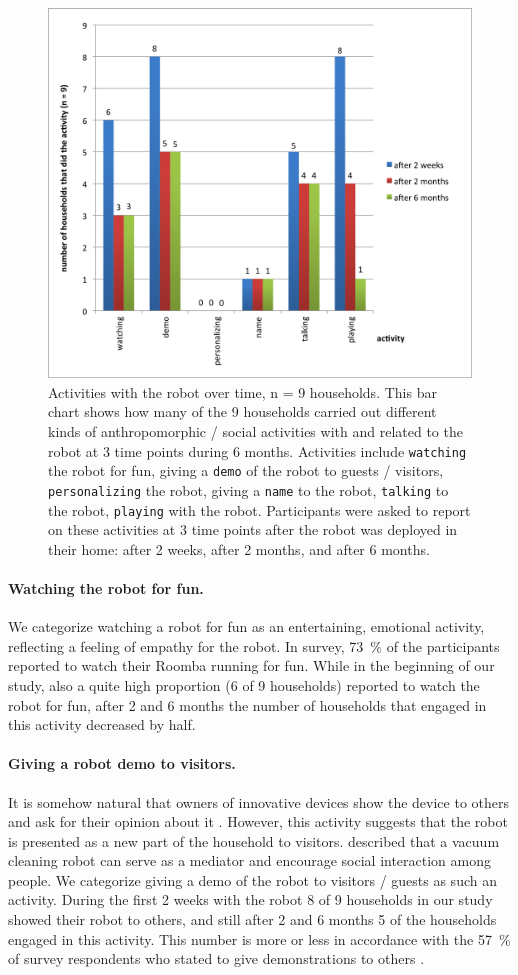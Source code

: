 \documentclass{frontiersSCNS} %
\begin{document}
\begin{figure}[hb]
    \centering
    \includegraphics[width=0.5\columnwidth]{roomba-activities.png}
    \caption{Activities with the robot over time, n = 9 households. This bar
        chart shows how many of the 9 households carried out different kinds of
        anthropomorphic / social activities with and related to the robot at 3
        time points during 6 months. Activities include \texttt{watching} the
        robot for fun, giving a \texttt{demo} of the robot to guests / visitors,
        \texttt{personalizing} the robot, giving a \texttt{name} to the robot,
        \texttt{talking} to the robot, \texttt{playing} with the robot.
        Participants were asked to report on these activities at 3 time points
        after the robot was deployed in their home: after 2 weeks, after 2 months,
        and after 6 months.} 

\label{fig:roomba-activities}
\end{figure}

\paragraph*{Watching the robot for fun.} We categorize watching a robot for fun
as an entertaining, emotional activity, reflecting a feeling of empathy for the
robot. In \cite{sung_housewives_2008} survey, 73~\% of the participants reported
to watch their Roomba running for fun. While in the beginning of our study, also
a quite high proportion (6 of 9 households) reported to watch the robot for fun,
after 2 and 6 months the number of households that engaged in this activity
decreased by half. 

\paragraph*{Giving a robot demo to visitors.} It is somehow natural that owners
of innovative devices show the device to others and ask for their opinion about
it \citep{rogers_diffusion_1995}. However, this activity suggests that the robot
is presented as a new part of the household to visitors.
\cite{sung_domestic_2010} described that a vacuum cleaning robot can serve as a
mediator and encourage social interaction among people. We categorize giving a
demo of the robot to visitors / guests as such an activity. During the first 2
weeks with the robot 8 of 9 households in our study showed their robot to
others, and still after 2 and 6 months 5 of the households engaged in this
activity. This number is more or less in accordance with the 57~\% of survey
respondents who stated to give demonstrations to others
\citep{sung_housewives_2008}.
\end{document}
